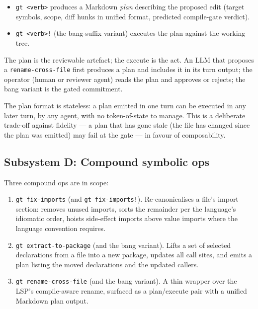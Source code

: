 \begin{itemize}[leftmargin=*]
  \item \texttt{gt \textless verb\textgreater} produces a Markdown
        \emph{plan} describing the proposed edit (target symbols,
        scope, diff hunks in unified format, predicted compile-gate
        verdict).
  \item \texttt{gt \textless verb\textgreater!} (the bang-suffix
        variant) executes the plan against the working tree.
\end{itemize}

The plan is the reviewable artefact; the execute is the act. An LLM
that proposes a \texttt{rename-cross-file} first produces a plan and
includes it in its turn output; the operator (human or reviewer
agent) reads the plan and approves or rejects; the bang variant is
the gated commitment.

The plan format is stateless: a plan emitted in one turn can be
executed in any later turn, by any agent, with no token-of-state to
manage. This is a deliberate trade-off against fidelity --- a plan
that has gone stale (the file has changed since the plan was
emitted) may fail at the gate --- in favour of composability.

\subsection{Subsystem D: Compound symbolic ops}
\label{sec:system:compounds}

Three compound ops are in scope:

\begin{enumerate}[leftmargin=*]
  \item \texttt{gt fix-imports} (and \texttt{gt fix-imports!}).
        Re-canonicalises a file's import section: removes unused
        imports, sorts the remainder per the language's idiomatic
        order, hoists side-effect imports above value imports where
        the language convention requires.
  \item \texttt{gt extract-to-package} (and the bang variant).
        Lifts a set of selected declarations from a file into a new
        package, updates all call sites, and emits a plan listing
        the moved declarations and the updated callers.
  \item \texttt{gt rename-cross-file} (and the bang variant). A
        thin wrapper over the LSP's compile-aware rename, surfaced
        as a plan/execute pair with a unified Markdown plan output.
\end{enumerate}

